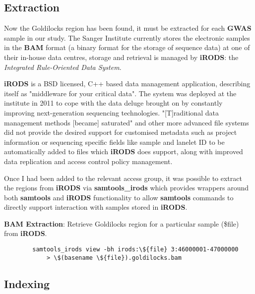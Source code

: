 \subsection{Extraction}

Now the Goldilocks region has been found, it must be extracted for each
\textbf{GWAS} sample in our study. The Sanger Institute currently stores the
electronic samples in the \textbf{BAM}\citep{bam} format (a binary format for
the storage of sequence data) at one of their in-house data centres, storage and
retrieval is managed by \textbf{iRODS}\citep{irods}: the \textit{Integrated
Rule-Oriented Data System}.

\textbf{iRODS} is a BSD licensed, C++ based data management application,
describing itself as "middleware for your critical data"\citep{github:irods}.
The system was deployed at the institute in 2011 to cope with the data deluge
brought on by constantly improving next-generation sequencing technologies.
"[T]raditional data management methods [became] saturated" and other more
advanced file systems did not provide the desired support for customised metadata
such as project information or sequencing specific fields like sample and
lanelet ID to be automatically added to files\citep{irods-sanger} which
\textbf{iRODS} does support, along with improved data replication and access
control policy management.

Once I had been added to the relevant access group, it was possible to extract
the regions from \textbf{iRODS} via
\textbf{samtools\_irods}\citep{github:samtools-irods} which provides wrappers
around both \textbf{samtools} and \textbf{iRODS} functionality to allow
\textbf{samtools} commands to directly support interaction with samples stored
in \textbf{iRODS}.

\begin{listing}[H]
    \caption[bamext]{\textbf{BAM Extraction}: Retrieve Goldilocks region for
        a particular sample (\$file) from \textbf{iRODS}.}
    \label{list:bamext}
    \begin{verbatim}
        samtools_irods view -bh irods:\${file} 3:46000001-47000000
            > \$(basename \${file}).goldilocks.bam
    \end{verbatim}
\end{listing}


\subsection{Indexing}

